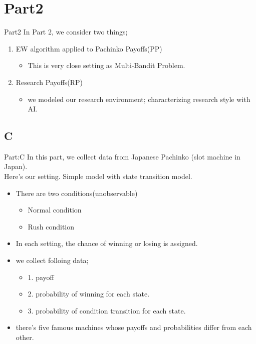 \documentclass{beamer}
\begin{document}
\section{Part2}
\begin{frame}{Part2}
In Part 2, we consider two things;
\begin{enumerate}
    \item EW algorithm applied to Pachinko Payoffs(PP)
    \begin{itemize}
        \item This is very close setting as Multi-Bandit Problem.
    \end{itemize}
    \item Research Payoffs(RP)
    \begin{itemize}
        \item we modeled our research environment; characterizing research style with AI.
    \end{itemize}
\end{enumerate}
    
\end{frame}

\subsection{C}

\begin{frame}{Part:C}
In this part, we collect data from Japanese Pachinko (slot machine in Japan).\\
Here's our setting. Simple model with state transition model.
\begin{itemize}
    \item There are two conditions(unobservable)
    \begin{itemize}
        \item Normal condition
        \item Rush condition
    \end{itemize}
    \item In each setting, the chance of winning or losing is assigned.
\end{itemize}
\begin{itemize}
    \item we collect folloing data; 
    \begin{itemize}
        \item 1. payoff
        \item 2. probability of winning for each state.
        \item 3. probability of condition transition for each state.
    \end{itemize}
    \item there's five famous machines whose payoffs and probabilities differ from each other.
\end{itemize}
\end{frame}
\end{document}

